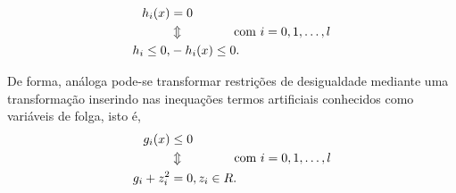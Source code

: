 	\begin{align*}%
		h_{i} (x) & = 0 \\
		& \Updownarrow \hspace{1.4cm} \mbox{com $i = 0,1, \dots, l$}\\ 
		h_{i} \leq 0,& -h_{i}(x) \leq 0. 
	\end{align*}

De forma, an\'aloga pode-se transformar restri\c c\~oes de desigualdade mediante uma transforma\c c\~ao inserindo nas inequa\c c\~oes
termos artificiais conhecidos como vari\'aveis de folga, isto \'e, 
	\begin{align*}%
		g_{i} (x) & \leq 0 \\ 
 		&\Updownarrow \hspace{1.4cm} \mbox{com $i = 0,1, \dots, l$}\\ 
 		g_{i}  + z_i^2 & = 0, z_i \in R. 
	\end{align*}

